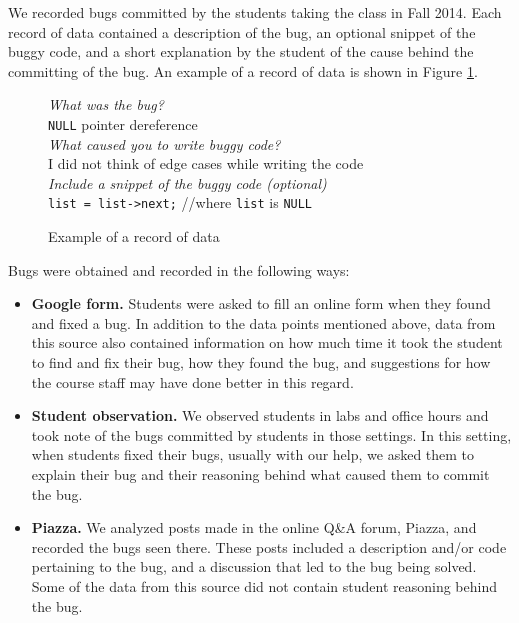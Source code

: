\documentclass{sig-alternate}
\begin{document}
We recorded bugs committed by the students taking the class in Fall 2014. Each record of data contained a description of the bug, an optional snippet of the buggy code, and a short explanation by the student of the cause behind the committing of the bug. An example of a record of data is shown in Figure \ref{fig:record}.\\

\begin{figure}
\begin{framed}
\emph{What was the bug?}\\
\verb|NULL| pointer dereference\\

\emph{What caused you to write buggy code?}\\
 I did not think of edge cases while writing the code\\

\emph{Include a snippet of the buggy code (optional)}\\
\verb|list = list->next;| //where \verb|list| is \verb|NULL|
\end{framed}
\caption{Example of a record of data}
\label{fig:record}
\end{figure}


Bugs were obtained and recorded in the following ways:
\begin{itemize}
\item{\textbf{Google form.} Students were asked to fill an online form when they found and fixed a bug. In addition to the data points mentioned above, data from this source also contained information on how much time it took the student to find and fix their bug, how they found the bug, and suggestions for how the course staff may have done better in this regard.}

\item{\textbf{Student observation.} We observed students in labs and office hours and took note of the bugs committed by students in those settings. In this setting, when students fixed their bugs, usually with our help, we asked them to explain their bug and their reasoning behind what caused them to commit the bug.}
\item{\textbf{Piazza.} We analyzed posts made in the online Q\&A forum, Piazza, and recorded the bugs seen there. These posts included a description and/or code pertaining to the bug, and a discussion that led to the bug being solved. Some of the data from this source did not contain student reasoning behind the bug.}
\end{itemize}
\end{document}
